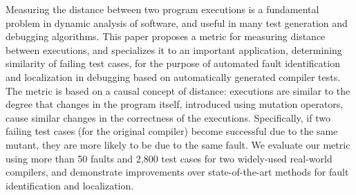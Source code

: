 Measuring the distance between two program executions is a fundamental problem in dynamic analysis of software, and useful in many test generation and debugging algorithms.  This paper proposes a metric for measuring distance between executions, and specializes it to an important application, determining similarity of failing test cases, for the purpose of automated fault identification and localization in debugging based on automatically generated compiler tests.  The metric is based on a causal concept of distance: executions are similar to the degree that changes in the program itself, introduced using mutation operators, cause similar changes in the correctness of the executions.  Specifically, if two failing test cases (for the original compiler) become successful due to the same mutant, they are more likely to be due to the same fault.  We evaluate our metric using more than 50 faults and 2,800 test cases for two widely-used real-world compilers, and demonstrate improvements over state-of-the-art methods for fault identification and localization.  